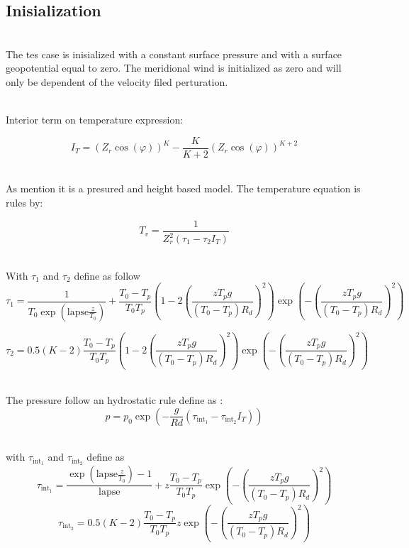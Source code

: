 \documentclass{article}
\begin{document}
\clearpage
\subsection{ Inisialization }
 ~\\ The tes case is inisialized with a constant surface pressure and with a surface geopotential equal to zero. The meridional wind is initialized as zero and will only be dependent of the velocity filed perturation. 

~\\Interior term on temperature expression:

\begin{equation*}
I_{T}=(Z_r\cos(\varphi))^K-\frac{K}{K+2}(Z_r\cos(\varphi))^{K+2}
\end{equation*}

~\\ As mention it is a presured and height based model.  The temperature equation is rules by:



\begin{equation*}
T_v=\frac{1}{Z_r^2(\tau_1-\tau_2 I_T)} 
\label{virtTemp}
\end{equation*}


~\\ With $\tau_1$ and $\tau_2$ define as follow
\begin{equation*}
\tau_1=\frac{1}{T_0\exp\left(\text{lapse}\frac{z}{T_0}\right)} + \frac{T_0-T_p}{T_0T_p}\left(1-2\left(\frac{zT_pg}{(T_0-T_p)R_d}\right)^2\right)\exp\left(-\left(\frac{zT_pg}{(T_0-T_p)R_d}\right)^2\right)
\end{equation*}



\begin{equation*}
\tau_2=0.5(K-2)\frac{T_0-T_p}{T_0T_p}\left(1-2\left(\frac{zT_pg}{(T_0-T_p)R_d}\right)^2\right)\exp\left(-\left(\frac{zT_pg}{(T_0-T_p)R_d}\right)^2\right)
\end{equation*}


~\\ The pressure follow an hydrostatic rule define as :
\begin{equation}
p=p_0\exp(-\frac{g}{Rd}(\tau_{\text{int}_1}-\tau_{\text{int}_2}I_T))
\end{equation}

~\\with $\tau_{\text{int}_1}$ and $\tau_{\text{int}_2}$ define as
\begin{equation*}
\tau_{\text{int}_1}=\frac{\exp\left( \text{lapse}\frac{z}{T_0} \right)-1}{\text{lapse}}+z\frac{T_0-T_p}{T_0T_p}\exp\left(-\left(\frac{zT_pg}{(T_0-T_p)R_d}\right)^2\right)
\end{equation*}
\begin{equation*}
\tau_{\text{int}_2}=0.5(K-2)\frac{T_0-T_p}{T_0T_p}z\exp\left(-\left(\frac{zT_pg}{(T_0-T_p)R_d}\right)^2\right)
\end{equation*}
\end{document}
